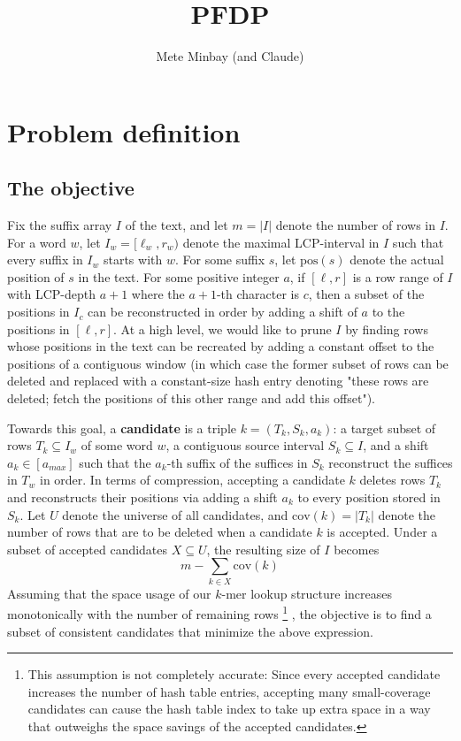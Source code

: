 \documentclass[11pt,a4paper]{article}
\title{PFDP}
\author{Mete Minbay (and Claude)}
\begin{document}
\maketitle

\section{Problem definition}

\subsection{The objective}

Fix the suffix array $I$ of the text, and let $m = |I|$ denote the number of rows in $I$. For a word $w$, let $I_w = [\ell _w, r_w)$ denote the maximal LCP-interval in $I$ such that every suffix in $I_w$ starts with $w$. For some suffix $s$, let $\mathrm{pos}(s)$ denote the actual position of $s$ in the text. For some positive integer $a$, if $[\ell , r]$ is a row range of $I$ with LCP-depth $a + 1$ where the $a +1$-th character is $c$, then a subset of the positions in $I_c$ can be reconstructed in order by adding a shift of $a$ to the positions in $[\ell, r]$. At a high level, we would like to prune $I$ by finding rows whose positions in the text can be recreated by adding a constant offset to the positions of a contiguous window (in which case the former subset of rows can be deleted and replaced with a constant-size hash entry denoting "these rows are deleted; fetch the positions of this other range and add this offset").

Towards this goal, a \textbf{candidate} is a triple $k = (T_k , S_k, a_k)$: a target subset of rows $T_k \subseteq I_w$ of some word $w$, a contiguous source interval $S_k \subseteq I$, and a shift $a_k \in [a_{max}]$ such that the $a_k$-th suffix of the suffices in $S_k$ reconstruct the suffices in $T_w$ in order. In terms of compression, accepting a candidate $k$ deletes rows $T_k$ and reconstructs their positions via adding a shift $a_k$ to every position stored in $S_k$. Let $U$ denote the universe of all candidates, and $\mathrm{cov}(k)=|T_k|$ denote the number of rows that are to be deleted when a candidate $k$ is accepted. Under a subset of accepted candidates $X \subseteq U$, the resulting size of $I$ becomes
\[
    m - \sum_{k \in X} \mathrm{cov}(k)
\]
Assuming that the space usage of our $k$-mer lookup structure increases monotonically with the number of remaining rows
\footnote{
    This assumption is not completely accurate: Since every accepted candidate increases the number of hash table entries, accepting many small-coverage candidates can cause the hash table index to take up extra space in a way that outweighs the space savings of the accepted candidates.
}
, the objective is to find a subset of consistent candidates that minimize the above expression.
\end{document}
